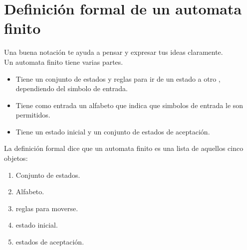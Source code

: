 \chapter{Definición formal de un automata finito}


Una buena notación te ayuda a pensar y expresar tus ideas claramente. \\
Un automata finito tiene varias partes.
\begin{itemize}
  \item Tiene un conjunto de estados y reglas para ir de un estado a otro
, dependiendo del simbolo de entrada. 
  \item Tiene como entrada un alfabeto que indica que simbolos de entrada 
le son permitidos.
  \item Tiene un estado inicial y un conjunto de estados de aceptación.
\end{itemize}
La definición formal dice que un automata finito es una lista de aquellos cinco objetos:
\begin{enumerate}
  \item Conjunto de estados.
  \item Alfabeto.
  \item reglas para moverse.
  \item estado inicial.
  \item estados de aceptación.
\end{enumerate}
